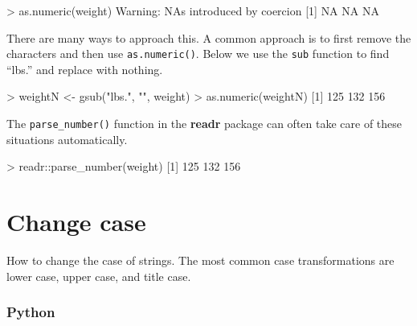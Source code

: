 \documentclass[
]{book}
\newenvironment{Shaded}{\begin{snugshade}}{\end{snugshade}}
\newcommand{\ConstantTok}[1]{\textcolor[rgb]{0.00,0.00,0.00}{#1}}
\newcommand{\DecValTok}[1]{\textcolor[rgb]{0.00,0.00,0.81}{#1}}
\newcommand{\FunctionTok}[1]{\textcolor[rgb]{0.00,0.00,0.00}{#1}}
\newcommand{\NormalTok}[1]{#1}
\newcommand{\OtherTok}[1]{\textcolor[rgb]{0.56,0.35,0.01}{#1}}
\newcommand{\SpecialCharTok}[1]{\textcolor[rgb]{0.00,0.00,0.00}{#1}}
\newcommand{\StringTok}[1]{\textcolor[rgb]{0.31,0.60,0.02}{#1}}
\begin{document}
\begin{Shaded}
\begin{Highlighting}[]
\SpecialCharTok{\textgreater{}} \FunctionTok{as.numeric}\NormalTok{(weight)}
\NormalTok{Warning}\SpecialCharTok{:}\NormalTok{ NAs introduced by coercion}
\NormalTok{[}\DecValTok{1}\NormalTok{] }\ConstantTok{NA} \ConstantTok{NA} \ConstantTok{NA}
\end{Highlighting}
\end{Shaded}

There are many ways to approach this. A common approach is to first remove the characters and then use \texttt{as.numeric()}. Below we use the \texttt{sub} function to find ``lbs.'' and replace with nothing.

\begin{Shaded}
\begin{Highlighting}[]
\SpecialCharTok{\textgreater{}}\NormalTok{ weightN }\OtherTok{\textless{}{-}} \FunctionTok{gsub}\NormalTok{(}\StringTok{"lbs."}\NormalTok{, }\StringTok{""}\NormalTok{, weight)}
\SpecialCharTok{\textgreater{}} \FunctionTok{as.numeric}\NormalTok{(weightN)}
\NormalTok{[}\DecValTok{1}\NormalTok{] }\DecValTok{125} \DecValTok{132} \DecValTok{156}
\end{Highlighting}
\end{Shaded}

The \texttt{parse\_number()} function in the \textbf{readr} package can often take care of these situations automatically.

\begin{Shaded}
\begin{Highlighting}[]
\SpecialCharTok{\textgreater{}}\NormalTok{ readr}\SpecialCharTok{::}\FunctionTok{parse\_number}\NormalTok{(weight)}
\NormalTok{[}\DecValTok{1}\NormalTok{] }\DecValTok{125} \DecValTok{132} \DecValTok{156}
\end{Highlighting}
\end{Shaded}

\hypertarget{change-case}{%
\section{Change case}\label{change-case}}

How to change the case of strings. The most common case transformations are lower case, upper case, and title case.

\hypertarget{python-20}{%
\subsubsection*{Python}\label{python-20}}
\end{document}
